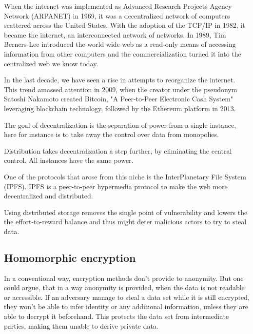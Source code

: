 When the internet was implemented as Advanced Research Projects Agency Network (ARPANET) in 1969, it was a decentralized network of computers scattered across the United States. With the adoption of the TCP/IP in 1982, it became the internet, an interconnected network of networks.
In 1989, Tim Berners-Lee introduced the world wide web as a read-only means of accessing information from other computers and the commercialization turned it into the centralized web we know today. 

In the last decade, we have seen a rise in attempts to reorganize the internet. This trend amassed attention in 2009, when the creator under the pseudonym Satoshi Nakamoto created Bitcoin, "A Peer-to-Peer Electronic Cash System" leveraging blockchain technology, followed by the Ethereum platform in 2013.

The goal of decentralization is the separation of power from a single instance, here for instance is to take away the control over data from monopolies. 

Distribution takes decentralization a step further, by eliminating the central control. All instances have the same power. 

One of the protocols that arose from this niche is the InterPlanetary File System (IPFS). IPFS is a peer-to-peer hypermedia protocol to make the web more decentralized and distributed.

Using distributed storage removes the single point of vulnerability and lowers the the effort-to-reward balance and thus might deter malicious actors to try to steal data.

\subsection{Homomorphic encryption}
In a conventional way, encryption methods don't provide to anonymity. But one could argue, that in a way anonymity is provided, when the data is not readable or accessible. If an adversary manage to steal a data set while it is still encrypted, they won't be able to infer identity or any additional information, unless they are able to decrypt it beforehand. This protects the data set from intermediate parties, making them unable to derive private data.

